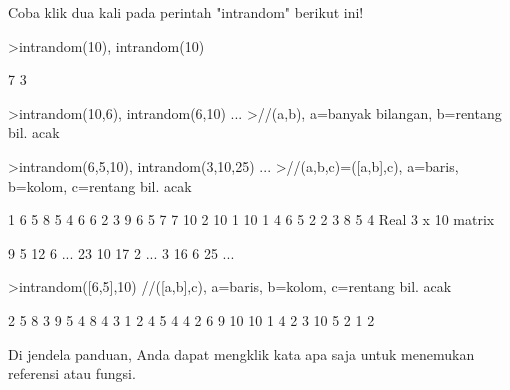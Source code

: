 \documentclass[a4paper,10pt]{article}
\begin{document}
\begin{eulernotebook}
\begin{eulercomment}
Coba klik dua kali pada perintah "intrandom" berikut ini!
\end{eulercomment}
\begin{eulerprompt}
>intrandom(10), intrandom(10)
\end{eulerprompt}
\begin{euleroutput}
  7
  3
\end{euleroutput}
\begin{eulerprompt}
>intrandom(10,6), intrandom(6,10) ...
>//(a,b), a=banyak bilangan, b=rentang bil. acak
\end{eulerprompt}
\begin{euleroutput}
  [6,  2,  4,  2,  3,  2,  2,  6,  2,  5]
  [3,  5,  4,  10,  2,  5]
\end{euleroutput}
\begin{eulerprompt}
>intrandom(6,5,10), intrandom(3,10,25) ...
>//(a,b,c)=([a,b],c), a=baris, b=kolom, c=rentang bil. acak
\end{eulerprompt}
\begin{euleroutput}
              1             6             5             8             5 
              4             6             6             2             3 
              9             6             5             7             7 
             10             2            10             1            10 
              1             4             6             5             2 
              2             3             8             5             4 
  Real 3 x 10 matrix
  
              9             5            12             6     ...
             23            10            17             2     ...
              3            16             6            25     ...
\end{euleroutput}
\begin{eulerprompt}
>intrandom([6,5],10) //([a,b],c), a=baris, b=kolom, c=rentang bil. acak
\end{eulerprompt}
\begin{euleroutput}
              2             5             8             3             9 
              5             4             8             4             3 
              1             2             4             5             4 
              4             2             6             9            10 
             10             1             4             2             3 
             10             5             2             1             2 
\end{euleroutput}
\begin{eulercomment}
Di jendela panduan, Anda dapat mengklik kata apa saja untuk menemukan
referensi atau fungsi.


\end{eulercomment}
\end{eulernotebook}
\end{document}
